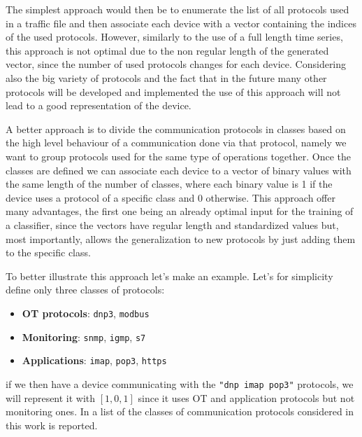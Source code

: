 The simplest approach would then be to enumerate the list of all protocols used in a traffic file and then associate each device with a vector containing the indices of the used protocols. However, similarly to the use of a full length time series, this approach is not optimal due to the non regular length of the generated vector, since the number of used protocols changes for each device. Considering also the big variety of protocols and the fact that in the future many other protocols will be developed and implemented the use of this approach will not lead to a good representation of the device.

A better approach is to divide the communication protocols in classes based on the high level behaviour of a communication done via that protocol, namely we want to group protocols used for the same type of operations together. Once the classes are defined we can associate each device to a vector of binary values with the same length of the number of classes, where each binary value is 1 if the device uses a protocol of a specific class and 0 otherwise. This approach offer many advantages, the first one being an already optimal input for the training of a classifier, since the vectors have regular length and standardized values but, most importantly, allows the generalization to new protocols by just adding them to the specific class.

To better illustrate this approach let's make an example. Let's for simplicity define only three classes of protocols:
\begin{itemize}
    \item \textbf{OT protocols}: \texttt{dnp3}, \texttt{modbus}
    \item \textbf{Monitoring}: \texttt{snmp}, \texttt{igmp}, \texttt{s7}
    \item \textbf{Applications}: \texttt{imap}, \texttt{pop3}, \texttt{https}
\end{itemize}

if we then have a device communicating with the \texttt{"dnp imap pop3"} protocols, we will represent it with  $[1,0,1]$ since it uses OT and application protocols but not monitoring ones.
In  a list of the classes of communication protocols considered in this work is reported.


